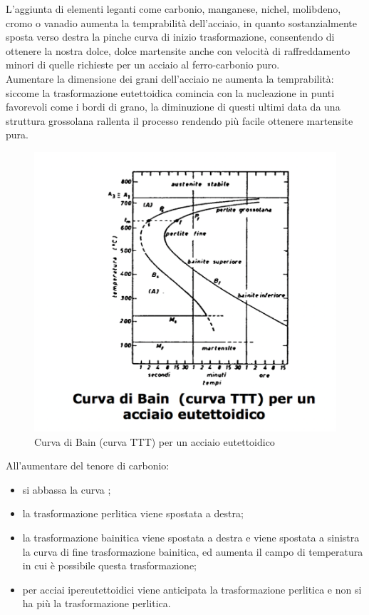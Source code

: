 L'aggiunta di elementi leganti come carbonio, manganese, nichel, molibdeno, cromo o vanadio aumenta la temprabilità dell'acciaio, in quanto sostanzialmente sposta verso destra la pinche curva di inizio trasformazione, consentendo di ottenere la nostra dolce, dolce martensite anche con velocità di raffreddamento minori di quelle richieste per un acciaio al ferro-carbonio puro.\\
Aumentare la dimensione dei grani dell'acciaio ne aumenta la temprabilità: siccome la trasformazione eutettoidica comincia con la nucleazione in punti favorevoli come i bordi di grano, la diminuzione di questi ultimi data da una struttura grossolana rallenta il processo rendendo più facile ottenere martensite pura.\\
\begin{figure}[!hbt]
\includegraphics[width=1\textwidth]{images/img32.png}
\caption{Curva di Bain (curva TTT) per un acciaio eutettoidico}
\end{figure}

All'aumentare del tenore di carbonio:
\begin{itemize}
    \item si abbassa la curva ;
    \item la trasformazione perlitica viene spostata a destra;
    \item la trasformazione bainitica viene spostata a destra e viene spostata a sinistra la curva di fine trasformazione bainitica, ed aumenta il campo di temperatura in cui è possibile questa trasformazione;
    \item per acciai ipereutettoidici viene anticipata la trasformazione perlitica e non si ha più la trasformazione perlitica.
\end{itemize}

